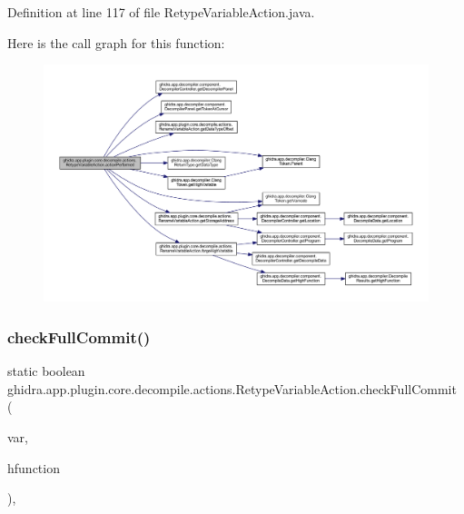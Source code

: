 Definition at line 117 of file Retype\+Variable\+Action.\+java.

Here is the call graph for this function\+:
\nopagebreak
\begin{figure}[H]
\begin{center}
\leavevmode
\includegraphics[width=350pt]{classghidra_1_1app_1_1plugin_1_1core_1_1decompile_1_1actions_1_1_retype_variable_action_a32493365e12a8b6545b765e7718cd6ea_cgraph}
\end{center}
\end{figure}
\mbox{\label{classghidra_1_1app_1_1plugin_1_1core_1_1decompile_1_1actions_1_1_retype_variable_action_a72953b7e56191b41bfbaae3e2ec00657}} 
\subsubsection{\texorpdfstring{checkFullCommit()}{checkFullCommit()}}
{\footnotesize\ttfamily static boolean ghidra.\+app.\+plugin.\+core.\+decompile.\+actions.\+Retype\+Variable\+Action.\+check\+Full\+Commit (\begin{DoxyParamCaption}\item[{\mbox{\hyperlink{class_high_variable}{High\+Variable}}}]{var,  }\item[{High\+Function}]{hfunction }\end{DoxyParamCaption})\hspace{0.3cm}{\ttfamily [inline]}, {\ttfamily [static]}}

